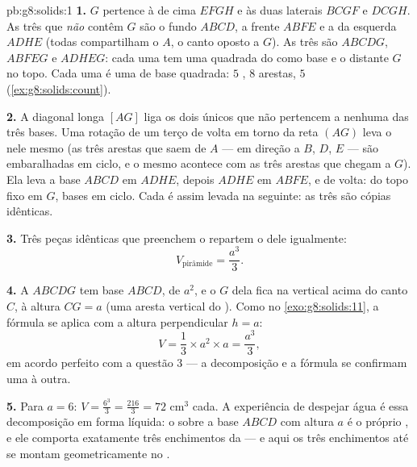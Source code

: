 \begin{solution}{pb:g8:solids:1}
\textbf{1.} $G$ pertence à  de cima $EFGH$ e às duas 
laterais $BCGF$ e $DCGH$. As três  que \emph{não} contêm $G$ são
o fundo $ABCD$, a frente $ABFE$ e a  da esquerda $ADHE$ (todas
compartilham o  $A$, o canto oposto a $G$). As três 
são $ABCDG$, $ABFEG$ e $ADHEG$: cada uma tem uma  quadrada do 
como base e o  distante $G$ no topo. Cada uma é uma  de
base quadrada: $5$ , $8$ arestas, $5$ 
(\cref{ex:g8:solids:count}).

\textbf{2.} A diagonal longa $[AG]$ liga os dois únicos  que
não pertencem a nenhuma das três bases. Uma rotação de um terço de
volta em torno da reta $(AG)$ leva o  nele mesmo (as três arestas
que saem de $A$ --- em direção a $B$, $D$, $E$ --- são embaralhadas em
ciclo, e o mesmo acontece com as três arestas que chegam a $G$). Ela
leva a base $ABCD$ em $ADHE$, depois $ADHE$ em $ABFE$, e de volta:
 do topo fixo em $G$, bases em ciclo. Cada  é assim
levada na seguinte: as três são cópias idênticas.

\textbf{3.} Três peças idênticas que preenchem o  repartem o
 dele igualmente:
\[
V_{\text{pirâmide}} = \frac{a^3}{3} .
\]

\textbf{4.} A  $ABCDG$ tem base $ABCD$, de  $a^2$, e o
 $G$ dela fica na vertical acima do canto $C$, à altura
$CG = a$ (uma aresta vertical do ). Como no
\cref{exo:g8:solids:11}, a fórmula se aplica com a altura
perpendicular $h = a$:
\[
V = \frac13 \times a^2 \times a = \frac{a^3}{3} ,
\]
em acordo perfeito com a questão 3 --- a decomposição e a fórmula se
confirmam uma à outra.

\textbf{5.} Para $a = 6$: $V = \frac{6^3}{3} = \frac{216}{3} = 72$
cm$^3$ cada. A experiência de despejar água é essa decomposição em
forma líquida: o  sobre a base $ABCD$ com altura $a$ é o próprio
, e ele comporta exatamente três enchimentos da  --- e
aqui os três enchimentos até se montam geometricamente no .


\end{solution}
